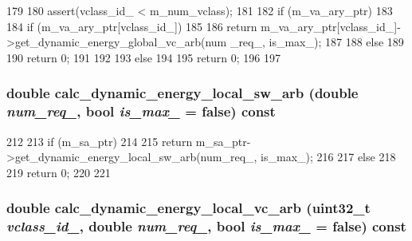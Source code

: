 \begin{DoxyCode}
179 {
180     assert(vclass_id_ < m_num_vclass);
181 
182     if (m_va_ary_ptr)
183     {
184         if (m_va_ary_ptr[vclass_id_])
185         {
186             return m_va_ary_ptr[vclass_id_]->get_dynamic_energy_global_vc_arb(num
      _req_, is_max_);
187         }
188         else
189         {
190             return 0;
191         }
192     }
193     else
194     {
195         return 0;
196     }
197 }
\end{DoxyCode}
\hypertarget{classOrionRouter_a726e4e57d9411dd1ac00ff03336c99b4}{
\subsubsection[{calc\_\-dynamic\_\-energy\_\-local\_\-sw\_\-arb}]{\setlength{\rightskip}{0pt plus 5cm}double calc\_\-dynamic\_\-energy\_\-local\_\-sw\_\-arb (double {\em num\_\-req\_\-}, \/  bool {\em is\_\-max\_\-} = {\ttfamily false}) const}}
\label{classOrionRouter_a726e4e57d9411dd1ac00ff03336c99b4}



\begin{DoxyCode}
212 {
213     if (m_sa_ptr)
214     {
215         return m_sa_ptr->get_dynamic_energy_local_sw_arb(num_req_, is_max_);
216     }
217     else
218     {
219         return 0;
220     }
221 }
\end{DoxyCode}
\hypertarget{classOrionRouter_ac8e3af98710aab6e2e13eef8facd648e}{
\subsubsection[{calc\_\-dynamic\_\-energy\_\-local\_\-vc\_\-arb}]{\setlength{\rightskip}{0pt plus 5cm}double calc\_\-dynamic\_\-energy\_\-local\_\-vc\_\-arb ({\bf uint32\_\-t} {\em vclass\_\-id\_\-}, \/  double {\em num\_\-req\_\-}, \/  bool {\em is\_\-max\_\-} = {\ttfamily false}) const}}
\label{classOrionRouter_ac8e3af98710aab6e2e13eef8facd648e}



